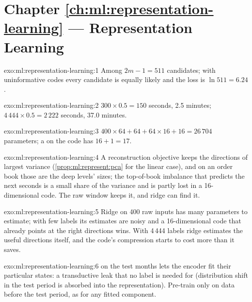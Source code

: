 \section*{Chapter \ref{ch:ml:representation-learning} --- Representation Learning}

\begin{solution}{exo:ml:representation-learning:1}
Among $2m - 1 = 511$ candidates; with uninformative codes every candidate is equally likely and the loss is
$\ln 511 = 6.24$.
\end{solution}

\begin{solution}{exo:ml:representation-learning:2}
$300\times0.5 = 150$ seconds, 2.5 minutes; $4\,444\times0.5 = 2\,222$ seconds, 37.0 minutes.
\end{solution}

\begin{solution}{exo:ml:representation-learning:3}
$400\times64 + 64 + 64\times16 + 16 = 26\,704$ parameters; a  on the code has $16 + 1 = 17$.
\end{solution}

\begin{solution}{exo:ml:representation-learning:4}
A reconstruction objective keeps the directions of largest variance (\cref{prop:ml:represent:pca} for the linear case),
and on an order book those are the deep levels' sizes; the top-of-book imbalance that predicts the next seconds is a small
share of the variance and is partly lost in a 16-dimensional code. The raw window keeps it, and ridge can find it.
\end{solution}

\begin{solution}{exo:ml:representation-learning:5}
Ridge on 400 raw inputs has many parameters to estimate; with few labels its estimates are noisy and a 16-dimensional
code that already points at the right directions wins. With 4\,444 labels ridge estimates the useful directions itself,
and the code's compression starts to cost more than it saves.
\end{solution}

\begin{solution}{exo:ml:representation-learning:6}
 on the test months lets the encoder fit their particular states: a transductive leak that no label is needed
for (distribution shift in the test period is absorbed into the representation). Pre-train only on data before the test
period, as for any fitted component.
\end{solution}

